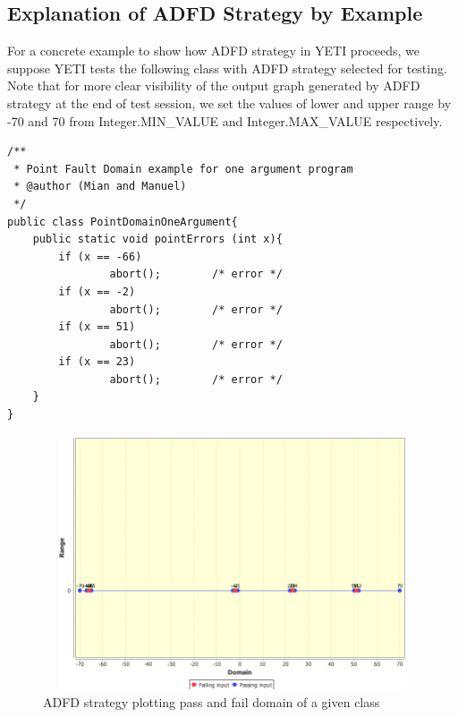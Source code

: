  

\subsection{Explanation of ADFD Strategy by Example}\label{sec:example}
For a concrete example to show how ADFD strategy in YETI proceeds, we suppose YETI tests the following class with ADFD strategy selected for testing. Note that for more clear visibility of the output graph generated by ADFD strategy at the end of test session, we set the values of lower and upper range by -70 and 70 from Integer.MIN\_VALUE and Integer.MAX\_VALUE respectively. 

\begin{lstlisting}
/**
 * Point Fault Domain example for one argument program
 * @author (Mian and Manuel)
 */
public class PointDomainOneArgument{
	public static void pointErrors (int x){
 		if (x == -66) 
			 	abort(); 		/* error */
		if (x == -2) 
			 	abort(); 		/* error */
 		if (x == 51) 
			 	abort(); 		/* error */
		if (x == 23) 
			 	abort(); 		/* error */
	}
}
\end{lstlisting}


\begin{figure}[H]
\centering
\includegraphics[width=14cm,height=7.5cm]{chapter5/pointDomainOneArgument.png}
\caption{ADFD strategy plotting pass and fail domain of a given class}
\label{fig:ADFD-example}
\end{figure}

